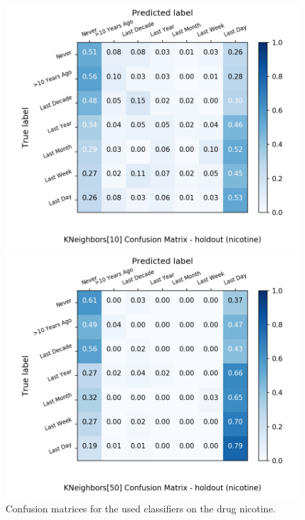 \begin{figure}[H]
\begin{minipage}[b]{0.32\textwidth}
		\includegraphics[width=1.1\textwidth]{Plots/nicotine_KNeighbors_10_balance_False_holdout.png}
  \end{minipage}
	\begin{minipage}[b]{0.32\textwidth}
		\includegraphics[width=1.1\textwidth]{Plots/nicotine_KNeighbors_50_balance_False_holdout.png}
  \end{minipage}
	\caption{Confusion matrices for the used classifiers on the drug nicotine.}
\end{figure}

